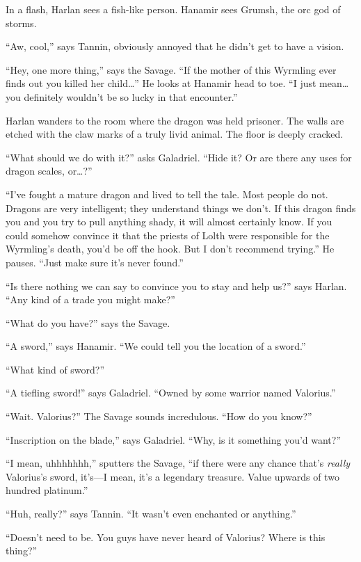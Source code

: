 \documentclass[smalldemyvopaper,11pt,twoside,onecolumn,openright,extrafontsizes]{memoir}
\begin{document}
In a flash, Harlan sees a fish-like person. Hanamir sees Grumsh, the orc
god of storms.

``Aw, cool,'' says Tannin, obviously annoyed that he didn't get to have
a vision.

``Hey, one more thing,'' says the Savage. ``If the mother of this
Wyrmling ever finds out you killed her child\ldots{}'' He looks at
Hanamir head to toe. ``I just mean\ldots{} you definitely wouldn't be so
lucky in that encounter.''

Harlan wanders to the room where the dragon was held prisoner. The walls
are etched with the claw marks of a truly livid animal. The floor is
deeply cracked.

``What should we do with it?'' asks Galadriel. ``Hide it? Or are there
any uses for dragon scales, or\ldots?''

``I've fought a mature dragon and lived to tell the tale. Most people do
not. Dragons are very intelligent; they understand things we don't. If
this dragon finds you and you try to pull anything shady, it will almost
certainly know. If you could somehow convince it that the priests of
Lolth were responsible for the Wyrmling's death, you'd be off the hook.
But I don't recommend trying.'' He pauses. ``Just make sure it's never
found.''

``Is there nothing we can say to convince you to stay and help us?''
says Harlan. ``Any kind of a trade you might make?''

``What do you have?'' says the Savage.

``A sword,'' says Hanamir. ``We could tell you the location of a
sword.''

``What kind of sword?''

``A tiefling sword!'' says Galadriel. ``Owned by some warrior named
Valorius.''

``Wait. Valorius?'' The Savage sounds incredulous. ``How do you know?''

``Inscription on the blade,'' says Galadriel. ``Why, is it something
you'd want?''

``I mean, uhhhhhhh,'' sputters the Savage, ``if there were any chance
that's \emph{really} Valorius's sword, it's---I mean, it's a legendary
treasure. Value upwards of two hundred platinum.''

``Huh, really?'' says Tannin. ``It wasn't even enchanted or anything.''

``Doesn't need to be. You guys have never heard of Valorius? Where is
this thing?''
\end{document}
